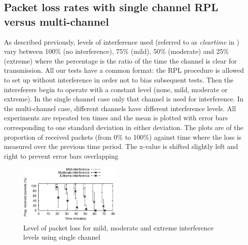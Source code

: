 

\subsection{Packet loss rates with single channel RPL versus multi-channel}

As described previously, levels of interference used (referred to as \emph{clear\textunderscore time} in \cite{Boano:2010:MSM:2127940.2127963})
vary between 100\% (no interference), 75\% (mild), 50\% (moderate) and 25\% (extreme) where the percentage is the ratio of the time the channel is clear for transmission.  All our tests have a common format: the RPL procedure is allowed to set up without interference in order not to bias subsequent tests.
Then the intereferers begin to operate with a constant level (none, mild, moderate or extreme).  In the single channel case only that channel is used for interference.  In the multi-channel case, different channels have different interference levels.  All experiments are repeated ten times and the mean
is plotted with error bars corresponding to one standard deviation in either deviation.  The plots are of the proportion of received packets (from 0\% to 100\%) against time where the loss is measured over the previous time period.  The x-value is shifted slightly left and right to prevent error bars overlapping

\begin{figure}
\centering
\includegraphics[width=0.45\textwidth]{experiments/single_channel.eps}
\caption{Level of packet loss for mild, moderate and extreme interference levels using single channel}
\label{fig:interference}
\end{figure}

